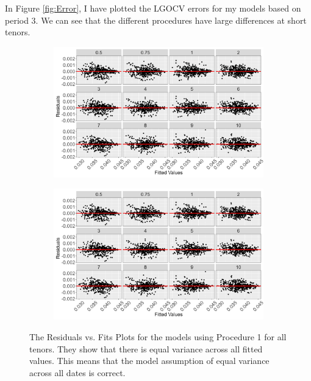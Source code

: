 In Figure \ref{fig:Error}, I have plotted the LGOCV errors for my models based on period 3. We can see that the different procedures have large differences at short tenors.



\begin{figure}[!htbp]
    \centering
    \captionsetup{type=figure}
    \begin{subfigure}{0.49\textwidth}
        \centering
        \captionsetup{justification=centering}
        \includegraphics[width=\textwidth]{Figures/Model Checking/zero_coupon_yields_phase_3_HJM_2F_procedure_1_poly_model_fitted_vs_residual_plot.png}
        \label{fig:resid vs fit poly model p 1}
    \end{subfigure}
    \hfill
    \begin{subfigure}{0.49\textwidth}
        \centering
        \captionsetup{justification=centering}
        \includegraphics[width=\textwidth]{Figures/Model Checking/zero_coupon_yields_phase_3_HJM_2F_procedure_1_spline_model_fitted_vs_residual_plot.png}
        \label{fig:resid vs fit spline model p 1}
    \end{subfigure}
    \caption[The Residuals vs. Fits Plots for the models using Procedure 1 for all tenors.]{The Residuals vs. Fits Plots for the models using Procedure 1 for all tenors. They show that there is equal variance across all fitted values. This means that the model assumption of equal variance across all dates is correct.}
    \label{fig:resid vs fit p 1}
\end{figure}

